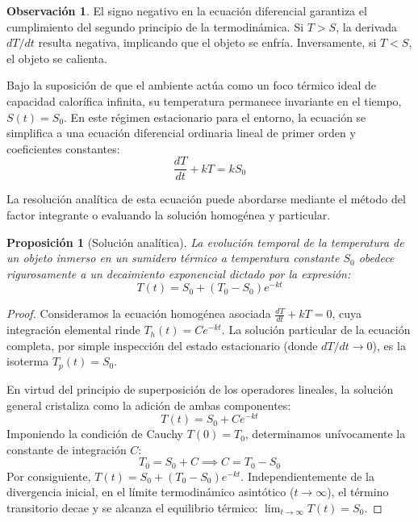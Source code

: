 \documentclass[11pt,a4paper]{article}
\theoremstyle{definition}
\newtheorem{remark}{Observación}[section]
\theoremstyle{plain}
\newtheorem{proposition}{Proposición}[section]
\begin{document}
\begin{remark}
El signo negativo en la ecuación diferencial garantiza el cumplimiento del segundo principio de la termodinámica. Si $T > S$, la derivada $dT/dt$ resulta negativa, implicando que el objeto se enfría. Inversamente, si $T < S$, el objeto se calienta.
\end{remark}

Bajo la suposición de que el ambiente actúa como un foco térmico ideal de capacidad calorífica infinita, su temperatura permanece invariante en el tiempo, $S(t) = S_0$. En este régimen estacionario para el entorno, la ecuación se simplifica a una ecuación diferencial ordinaria lineal de primer orden y coeficientes constantes:
\begin{equation}
    \frac{dT}{dt} + kT = kS_0
\end{equation}

La resolución analítica de esta ecuación puede abordarse mediante el método del factor integrante o evaluando la solución homogénea y particular.

\begin{proposition}[Solución analítica]
La evolución temporal de la temperatura de un objeto inmerso en un sumidero térmico a temperatura constante $S_0$ obedece rigurosamente a un decaimiento exponencial dictado por la expresión:
\begin{equation}
    T(t) = S_0 + (T_0 - S_0)e^{-kt}
\end{equation}
\end{proposition}

\begin{proof}
Consideramos la ecuación homogénea asociada $\frac{dT}{dt} + kT = 0$, cuya integración elemental rinde $T_h(t) = C e^{-kt}$. La solución particular de la ecuación completa, por simple inspección del estado estacionario (donde $dT/dt \to 0$), es la isoterma $T_p(t) = S_0$. 

En virtud del principio de superposición de los operadores lineales, la solución general cristaliza como la adición de ambas componentes:
\begin{equation*}
    T(t) = S_0 + C e^{-kt}
\end{equation*}
Imponiendo la condición de Cauchy $T(0) = T_0$, determinamos unívocamente la constante de integración $C$:
\begin{equation*}
    T_0 = S_0 + C \implies C = T_0 - S_0
\end{equation*}
Por consiguiente, $T(t) = S_0 + (T_0 - S_0)e^{-kt}$. Independientemente de la divergencia inicial, en el límite termodinámico asintótico ($t \to \infty$), el término transitorio decae y se alcanza el equilibrio térmico: $\lim_{t \to \infty} T(t) = S_0$.
\end{proof}
\end{document}
